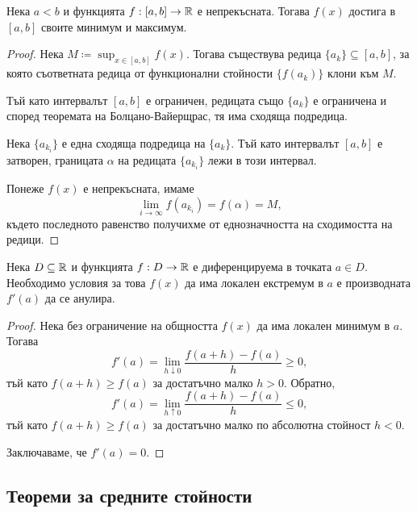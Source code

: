 \documentclass[numbers=endperiod, DIV=15, bibliography=totocnumbered]{scrartcl}
\begin{document}
\begin{theorem}[Вайерщрас]
  Нека $a < b$ и функцията $f: [a, b] \to \mathbb{R}$ е непрекъсната. Тогава $f(x)$ достига в $[a, b]$ своите минимум и максимум.
\end{theorem}
\begin{proof}
  Нека $M \coloneqq \sup_{x \in [a, b]} f(x)$. Тогава съществува редица $\{ a_k \} \subseteq [a, b]$, за която съответната редица от функционални стойности $\{ f(a_k) \}$ клони към $M$.

  Тъй като интервалът $[a, b]$ е ограничен, редицата също $\{ a_k \}$ е ограничена и според теоремата на Болцано-Вайерщрас, тя има сходяща подредица.

  Нека $\{ a_{k_i} \}$ е една сходяща подредица на $\{ a_k \}$. Тъй като интервалът $[a, b]$ е затворен, границата $\alpha$ на редицата $\{ a_{k_i} \}$ лежи в този интервал.

  Понеже $f(x)$ е непрекъсната, имаме
  \begin{displaymath}
    \lim_{i \to \infty} f(a_{k_i}) = f(\alpha) = M,
  \end{displaymath}
  където последното равенство получихме от еднозначността на сходимостта на редици.
\end{proof}

\begin{theorem}[Ферма]
  Нека $D \subseteq \mathbb{R}$ и функцията $f: D \to \mathbb{R}$ е диференцируема в точката $a \in D$. Необходимо условия за това $f(x)$ да има локален екстремум в $a$ е производната $f'(a)$ да се анулира.
\end{theorem}
\begin{proof}
  Нека без ограничение на общността $f(x)$ да има локален минимум в $a$. Тогава
  \begin{displaymath}
    f'(a) = \lim_{h \downarrow 0} \frac {f(a+h) - f(a)} h \geq 0,
  \end{displaymath}
  тъй като $f(a+h) \geq f(a)$ за достатъчно малко $h > 0$. Обратно,
  \begin{displaymath}
    f'(a) = \lim_{h \uparrow 0} \frac {f(a+h) - f(a)} h \leq 0,
  \end{displaymath}
  тъй като $f(a+h) \geq f(a)$ за достатъчно малко по абсолютна стойност $h < 0$.

  Заключаваме, че $f'(a) = 0$.
\end{proof}

\subsection{Теореми за средните стойности}
\end{document}
